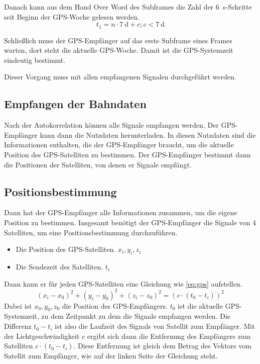 \documentclass[12pt,a4paper]{scrartcl}
\begin{document}
Danach kann aus dem Hand Over Word des Subframes die Zahl der \SI{6}{\second}-Schritte seit Beginn der GPS-Woche gelesen werden. $$t_1 = n\cdot\SI{7}{\day} + c; c<\SI{7}{\day}$$

Schließlich muss der GPS-Empfänger auf das erste Subframe eines Frames warten, dort steht die aktuelle GPS-Woche. Damit ist die GPS-Systemzeit eindeutig bestimmt.

Dieser Vorgang muss mit allen empfangenen Signalen durchgeführt werden.

\subsection{Empfangen der Bahndaten}
Nach der Autokorrelation können alle Signale empfangen werden. Der GPS-Empfänger kann dann die Nutzdaten herunterladen. In diesen Nutzdaten sind die Informationen enthalten, die der GPS-Empfänger braucht, um die aktuelle Position des GPS-Satelliten zu bestimmen. Der GPS-Empfänger bestimmt dann die Positionen der Satelliten, von denen er Signale empfängt.

\subsection{Positionsbestimmung}
\label{sec:positioning}
Dann hat der GPS-Empfänger alle Informationen zusammen, um die eigene Position zu bestimmen. Insgesamt benötigt der GPS-Empfänger die Signale von 4 Satelliten, um eine Positionsbestimmung durchzuführen.

\begin{itemize}
\item Die Position des GPS-Satelliten. $x_i,y_i,z_i$
\item Die Sendezeit des Satelliten. $t_i$
\end{itemize}

Dann kann er für jeden GPS-Satelliten eine Gleichung wie \eqref{eq:gps} aufstellen.
\begin{equation}
\label{eq:gps}
(x_i - x_0)^2 + (y_i - y_0)^2 + (z_i - z_0)^2 = (c\cdot(t_0-t_i))^2
\end{equation}
Dabei ist $x_0,y_0,z_0$ die Position des GPS-Empfängers. $t_0$ ist die aktuelle GPS-Systemzeit, zu dem Zeitpunkt zu dem die Signale empfangen werden. Die Differenz $t_0-t_i$ ist also die Laufzeit des Signals von Satellit zum Empfänger. Mit der Lichtgeschwindigkeit $c$ ergibt sich dann die Entfernung des Empfängers zum Satelliten $c\cdot (t_0-t_i)$. Diese Entfernung ist gleich dem Betrag des Vektors vom Satellit zum Empfänger, wie auf der linken Seite der Gleichung steht.
\end{document}
